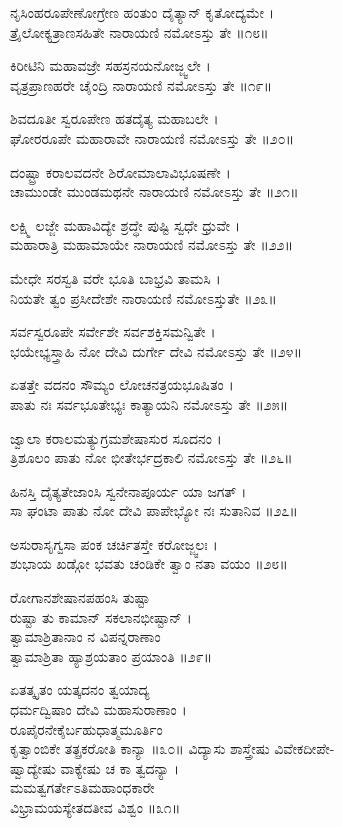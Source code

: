 ನೃಸಿಂಹರೂಪೇಣೋಗ್ರೇಣ ಹಂತುಂ ದೈತ್ಯಾನ್ ಕೃತೋದ್ಯಮೇ ।\\
ತ್ರೈಲೋಕ್ಯತ್ರಾಣಸಹಿತೇ ನಾರಾಯಣಿ ನಮೋಽಸ್ತು ತೇ ॥೧೮॥

ಕಿರೀಟಿನಿ ಮಹಾವಜ್ರೇ ಸಹಸ್ರನಯನೋಜ್ಜ್ವಲೇ ।\\
ವೃತ್ರಪ್ರಾಣಹರೇ ಚೈಂದ್ರಿ ನಾರಾಯಣಿ ನಮೋಽಸ್ತು ತೇ ॥೧೯॥

ಶಿವದೂತೀ ಸ್ವರೂಪೇಣ ಹತದೈತ್ಯ ಮಹಾಬಲೇ ।\\
ಘೋರರೂಪೇ ಮಹಾರಾವೇ ನಾರಾಯಣಿ ನಮೋಽಸ್ತು ತೇ ॥೨೦॥

ದಂಷ್ಟ್ರಾ ಕರಾಲವದನೇ ಶಿರೋಮಾಲಾವಿಭೂಷಣೇ ।\\
ಚಾಮುಂಡೇ ಮುಂಡಮಥನೇ ನಾರಾಯಣಿ ನಮೋಽಸ್ತು ತೇ ॥೨೧॥

ಲಕ್ಷ್ಮಿ ಲಜ್ಜೇ ಮಹಾವಿದ್ಯೇ ಶ್ರದ್ಧೇ ಪುಷ್ಟಿ ಸ್ವಧೇ ಧ್ರುವೇ ।\\
ಮಹಾರಾತ್ರಿ ಮಹಾಮಾಯೇ ನಾರಾಯಣಿ ನಮೋಽಸ್ತು ತೇ ॥೨೨॥

ಮೇಧೇ ಸರಸ್ವತಿ ವರೇ ಭೂತಿ ಬಾಭ್ರವಿ ತಾಮಸಿ ।\\
ನಿಯತೇ ತ್ವಂ ಪ್ರಸೀದೇಶೇ ನಾರಾಯಣಿ ನಮೋಽಸ್ತುತೇ ॥೨೩॥

ಸರ್ವಸ್ವರೂಪೇ ಸರ್ವೇಶೇ ಸರ್ವಶಕ್ತಿಸಮನ್ವಿತೇ ।\\
ಭಯೇಭ್ಯಸ್ತ್ರಾಹಿ ನೋ ದೇವಿ ದುರ್ಗೇ ದೇವಿ ನಮೋಽಸ್ತು ತೇ ॥೨೪॥

ಏತತ್ತೇ ವದನಂ ಸೌಮ್ಯಂ ಲೋಚನತ್ರಯಭೂಷಿತಂ ।\\
ಪಾತು ನಃ ಸರ್ವಭೂತೇಭ್ಯಃ ಕಾತ್ಯಾಯನಿ ನಮೋಽಸ್ತು ತೇ ॥೨೫॥

ಜ್ವಾಲಾ ಕರಾಲಮತ್ಯುಗ್ರಮಶೇಷಾಸುರ ಸೂದನಂ ।\\
ತ್ರಿಶೂಲಂ ಪಾತು ನೋ ಭೀತೇರ್ಭದ್ರಕಾಲಿ ನಮೋಽಸ್ತು ತೇ ॥೨೬॥

ಹಿನಸ್ತಿ ದೈತ್ಯತೇಜಾಂಸಿ ಸ್ವನೇನಾಪೂರ್ಯ ಯಾ ಜಗತ್ ।\\
ಸಾ ಘಂಟಾ ಪಾತು ನೋ ದೇವಿ ಪಾಪೇಭ್ಯೋ ನಃ ಸುತಾನಿವ ॥೨೭॥

ಅಸುರಾಸೃಗ್ವಸಾ ಪಂಕ ಚರ್ಚಿತಸ್ತೇ ಕರೋಜ್ಜ್ವಲಃ ।\\
ಶುಭಾಯ ಖಡ್ಗೋ ಭವತು ಚಂಡಿಕೇ ತ್ವಾಂ ನತಾ ವಯಂ ॥೨೮॥

ರೋಗಾನಶೇಷಾನಪಹಂಸಿ ತುಷ್ಟಾ\\
        ರುಷ್ಟಾ ತು ಕಾಮಾನ್ ಸಕಲಾನಭೀಷ್ಟಾನ್ ।\\
ತ್ವಾಮಾಶ್ರಿತಾನಾಂ ನ ವಿಪನ್ನರಾಣಾಂ\\
        ತ್ವಾಮಾಶ್ರಿತಾ ಹ್ಯಾಶ್ರಯತಾಂ ಪ್ರಯಾಂತಿ ॥೨೯॥

ಏತತ್ಕೃತಂ ಯತ್ಕದನಂ ತ್ವಯಾದ್ಯ\\
        ಧರ್ಮದ್ವಿಷಾಂ ದೇವಿ ಮಹಾಸುರಾಣಾಂ ।\\
ರೂಪೈರನೇಕೈರ್ಬಹುಧಾತ್ಮಮೂರ್ತಿಂ\\
        ಕೃತ್ವಾಂಬಿಕೇ ತತ್ಪ್ರಕರೋತಿ ಕಾನ್ಯಾ ॥೩೦॥
\newpage
ವಿದ್ಯಾಸು ಶಾಸ್ತ್ರೇಷು ವಿವೇಕದೀಪೇ-\\
      ಷ್ವಾದ್ಯೇಷು ವಾಕ್ಯೇಷು ಚ ಕಾ ತ್ವದನ್ಯಾ ।\\
ಮಮತ್ವಗರ್ತೇಽತಿಮಹಾಂಧಕಾರೇ\\
      ವಿಭ್ರಾಮಯಸ್ಯೇತದತೀವ ವಿಶ್ವಂ ॥೩೧॥


